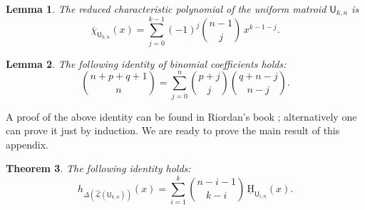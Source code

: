 \documentclass[11pt, a4paper, english]{amsart}
\theoremstyle{teoremas}
\newtheorem{theorem}{Theorem}[section]
\newtheorem{lemma}[theorem]{Lemma}
\theoremstyle{definition}
\newcommand{\U}{\mathsf{U}}
\newcommand{\uH}{\underline{\mathrm{H}}}
\begin{document}
\begin{lemma}\label{reduced-char-poly}
    The reduced characteristic polynomial of the uniform matroid $\U_{k,n}$ is
    \[ \overline{\chi}_{\U_{k,n}}(x) = \sum_{j=0}^{k-1} (-1)^j \binom{n-1}{j}\, x^{k-1-j}. \]
\end{lemma}


\begin{lemma}\label{lemma:riordan}
    The following identity of binomial coefficients holds:
    \[ \binom{n+p+q+1}{n} = \sum_{j=0}^n \binom{p+j}{j}\binom{q+n-j}{n-j}.\]
\end{lemma}

A proof of the above identity can be found in Riordan's book \cite[p.~148]{riordan}; alternatively one can prove it just by induction. We are ready to prove the main result of this appendix.


\begin{theorem}
    The following identity holds:
    \[ h_{\Delta(\widehat{\mathcal{L}}(\U_{k,n}))}(x) = \sum_{i=1}^k \binom{n-i-1}{k-i}\, \uH_{\U_{i,n}}(x).\]
\end{theorem}
\end{document}
